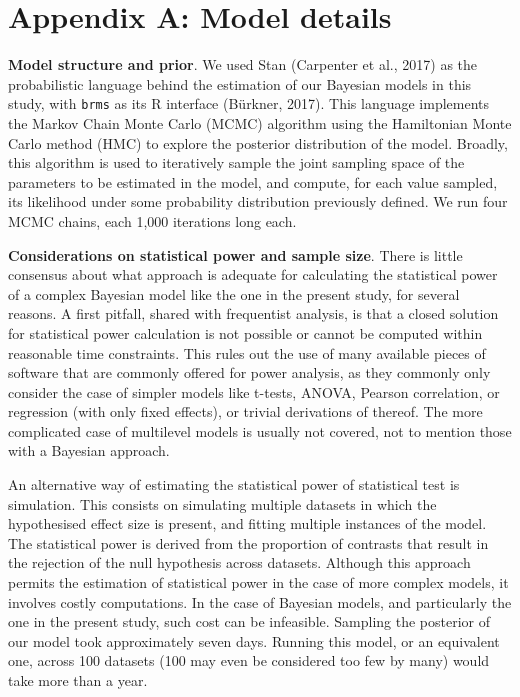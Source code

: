 \documentclass[
  12pt,
  b5paperpaper,
  twoside]{scrreprt}
\begin{document}
\hypertarget{appendix-a-model-details}{%
\section{Appendix A: Model details}\label{appendix-a-model-details}}

\textbf{Model structure and prior}. We used Stan (Carpenter et al.,
2017) as the probabilistic language behind the estimation of our
Bayesian models in this study, with \texttt{brms} as its R interface
(Bürkner, 2017). This language implements the Markov Chain Monte Carlo
(MCMC) algorithm using the Hamiltonian Monte Carlo method (HMC) to
explore the posterior distribution of the model. Broadly, this algorithm
is used to iteratively sample the joint sampling space of the parameters
to be estimated in the model, and compute, for each value sampled, its
likelihood under some probability distribution previously defined. We
run four MCMC chains, each 1,000 iterations long each.

\textbf{Considerations on statistical power and sample size}. There is
little consensus about what approach is adequate for calculating the
statistical power of a complex Bayesian model like the one in the
present study, for several reasons. A first pitfall, shared with
frequentist analysis, is that a closed solution for statistical power
calculation is not possible or cannot be computed within reasonable time
constraints. This rules out the use of many available pieces of software
that are commonly offered for power analysis, as they commonly only
consider the case of simpler models like t-tests, ANOVA, Pearson
correlation, or regression (with only fixed effects), or trivial
derivations of thereof. The more complicated case of multilevel models
is usually not covered, not to mention those with a Bayesian approach.

An alternative way of estimating the statistical power of statistical
test is simulation. This consists on simulating multiple datasets in
which the hypothesised effect size is present, and fitting multiple
instances of the model. The statistical power is derived from the
proportion of contrasts that result in the rejection of the null
hypothesis across datasets. Although this approach permits the
estimation of statistical power in the case of more complex models, it
involves costly computations. In the case of Bayesian models, and
particularly the one in the present study, such cost can be infeasible.
Sampling the posterior of our model took approximately seven days.
Running this model, or an equivalent one, across 100 datasets (100 may
even be considered too few by many) would take more than a year.
\end{document}
